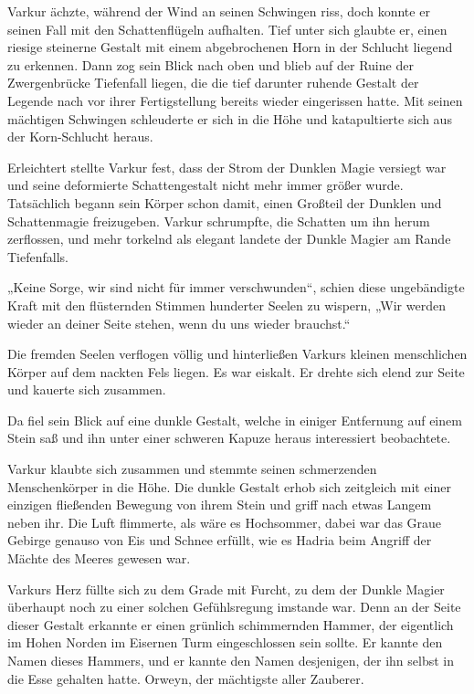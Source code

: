\documentclass[10pt, a4paper, oneside]{book}
\begin{document}
Varkur ächzte, während der Wind an seinen Schwingen riss, doch konnte er seinen Fall mit den Schattenflügeln aufhalten. Tief unter sich glaubte er, einen riesige steinerne Gestalt mit einem abgebrochenen Horn in der Schlucht liegend zu erkennen. Dann zog sein Blick nach oben und blieb auf der Ruine der Zwergenbrücke Tiefenfall liegen, die die tief darunter ruhende Gestalt der Legende nach vor ihrer Fertigstellung bereits wieder eingerissen hatte. Mit seinen mächtigen Schwingen schleuderte er sich in die Höhe und katapultierte sich aus der Korn-Schlucht heraus.

Erleichtert stellte Varkur fest, dass der Strom der Dunklen Magie versiegt war und seine deformierte Schattengestalt nicht mehr immer größer wurde. Tatsächlich begann sein Körper schon damit, einen Großteil der Dunklen und Schattenmagie freizugeben. Varkur schrumpfte, die Schatten um ihn herum zerflossen, und mehr torkelnd als elegant landete der Dunkle Magier am Rande Tiefenfalls.

„Keine Sorge, wir sind nicht für immer verschwunden“, schien diese ungebändigte Kraft mit den flüsternden Stimmen hunderter Seelen zu wispern, „Wir werden wieder an deiner Seite stehen, wenn du uns wieder brauchst.“

Die fremden Seelen verflogen völlig und hinterließen Varkurs kleinen menschlichen Körper auf dem nackten Fels liegen. Es war eiskalt. Er drehte sich elend zur Seite und kauerte sich zusammen.

Da fiel sein Blick auf eine dunkle Gestalt, welche in einiger Entfernung auf einem Stein saß und ihn unter einer schweren Kapuze heraus interessiert beobachtete.

Varkur klaubte sich zusammen und stemmte seinen schmerzenden Menschenkörper in die Höhe. Die dunkle Gestalt erhob sich zeitgleich mit einer einzigen fließenden Bewegung von ihrem Stein und griff nach etwas Langem neben ihr. Die Luft flimmerte, als wäre es Hochsommer, dabei war das Graue Gebirge genauso von Eis und Schnee erfüllt, wie es Hadria beim Angriff der Mächte des Meeres gewesen war.

Varkurs Herz füllte sich zu dem Grade mit Furcht, zu dem der Dunkle Magier überhaupt noch zu einer solchen Gefühlsregung imstande war. Denn an der Seite dieser Gestalt erkannte er einen grünlich schimmernden Hammer, der eigentlich im Hohen Norden im Eisernen Turm eingeschlossen sein sollte. Er kannte den Namen dieses Hammers, und er kannte den Namen desjenigen, der ihn selbst in die Esse gehalten hatte. Orweyn, der mächtigste aller Zauberer.
\end{document}
